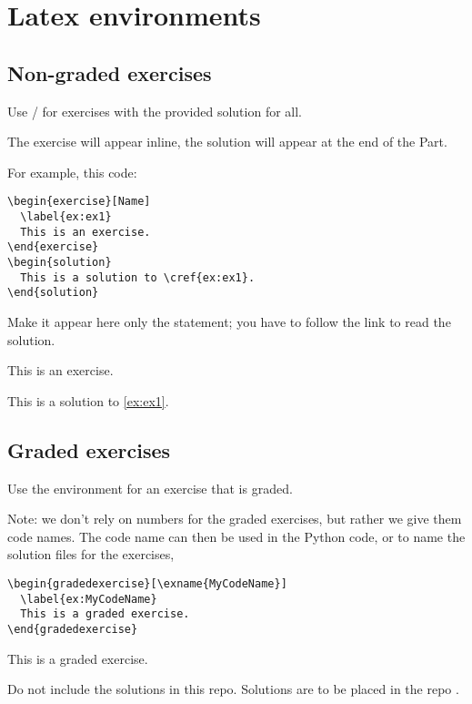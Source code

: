 
\section{Latex environments}

\subsection{Non-graded exercises}

Use / for exercises with the provided solution for all.

The exercise will appear inline, the solution will appear at the end of the Part.

For example, this code:

\begin{verbatim}
\begin{exercise}[Name]
  \label{ex:ex1}
  This is an exercise.
\end{exercise}
\begin{solution}
  This is a solution to \cref{ex:ex1}.
\end{solution}
\end{verbatim}

Make it appear here only the statement; you have to follow the link to read the solution.

\begin{exercise}[Name]
    \label{ex:ex1}
    This is an exercise.
\end{exercise}
\begin{solution}
    This is a solution to \cref{ex:ex1}.
\end{solution}

\subsection{Graded exercises}

Use the environment  for an exercise that is graded.

Note: we don't rely on numbers for the graded exercises, but rather we give them code names.
The code name can then be used in the Python code, or to name the solution files for the exercises, \etc

\begin{verbatim}
\begin{gradedexercise}[\exname{MyCodeName}]
  \label{ex:MyCodeName}
  This is a graded exercise.
\end{gradedexercise}
\end{verbatim}

\begin{gradedexercise}
    This is a graded exercise.
\end{gradedexercise}

Do not include the solutions in this repo.
Solutions are to be placed in the repo .

